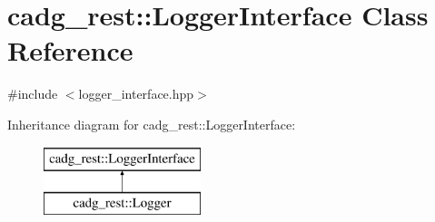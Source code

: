 \hypertarget{classcadg__rest_1_1_logger_interface}{}\section{cadg\+\_\+rest\+::Logger\+Interface Class Reference}
\label{classcadg__rest_1_1_logger_interface}


{\ttfamily \#include $<$logger\+\_\+interface.\+hpp$>$}

Inheritance diagram for cadg\+\_\+rest\+::Logger\+Interface\+:\begin{figure}[H]
\begin{center}
\leavevmode
\includegraphics[height=2.000000cm]{classcadg__rest_1_1_logger_interface}
\end{center}
\end{figure}
